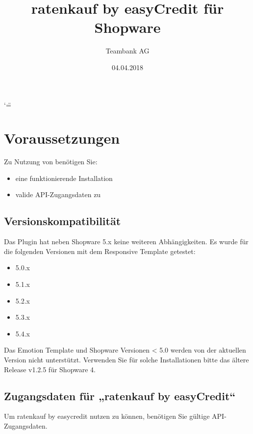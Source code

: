 \documentclass[a4paper,10pt,openany,oneside,ngerman]{sphinxmanual}
\title{ratenkauf by easyCredit für Shopware}
\date{04.04.2018}
\author{Teambank AG}
\begin{document}
\ifnum\catcode`\"=\active{}\fi
\maketitle
\sphinxtableofcontents
{}\label{\detokenize{index::doc}}



\chapter{Voraussetzungen}
\label{\detokenize{requirements:ratenkauf-by-easycredit-fur-shopware-5-x}}\label{\detokenize{requirements::doc}}\label{\detokenize{requirements:voraussetzungen}}
Zu Nutzung von  benötigen Sie:
\begin{itemize}
\item {} 
eine funktionierende  Installation

\item {} 
valide API-Zugangsdaten zu 

\end{itemize}


\section{Versionskompatibilität}
\label{\detokenize{requirements:versionskompatibilitat}}
Das Plugin hat neben Shopware 5.x keine weiteren Abhängigkeiten. Es wurde für die folgenden Versionen mit dem Responsive Template getestet:
\begin{itemize}
\item {} 
5.0.x

\item {} 
5.1.x

\item {} 
5.2.x

\item {} 
5.3.x

\item {} 
5.4.x

\end{itemize}

Das Emotion Template und Shopware Versionen \textless{} 5.0 werden von der aktuellen Version nicht unterstützt.
Verwenden Sie für solche Installationen bitte das ältere Release v1.2.5 für Shopware 4.


\section{Zugangsdaten für „ratenkauf by easyCredit“}
\label{\detokenize{requirements:zugangsdaten-fur-ratenkauf-by-easycredit}}
Um ratenkauf by easycredit nutzen zu können, benötigen Sie gültige API-Zugangsdaten.
\end{document}
